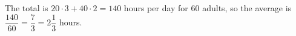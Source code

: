 The total is $20\cdot3+40\cdot2=140$ hours per day for $60$ adults, so the average is $\dfrac{140}{60}=\dfrac{7}{3}=\boxed{2\dfrac{1}{3}}$ hours.
